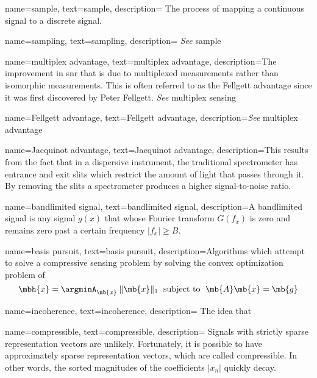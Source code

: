 {
name={sample},
text={sample},
description={ The process of mapping a continuous signal to a discrete signal.  }
}

{
name={sampling},
text={sampling},
description={ \emph{See} \gls{sample}  }
}



{
name={multiplex advantage},
text={multiplex advantage},
description={The improvement in \gls{snr} that is due to multiplexed measurements rather than isomorphic measurements. This is often referred to as the Fellgett advantage since it was first discovered by Peter Fellgett. \emph{See} \gls{multiplex sensing}} 
}

{
name={Fellgett advantage},
text={Fellgett advantage},
description={\emph{See} \gls{multiplex advantage}} 
}

{
name={Jacquinot advantage},
text={Jacquinot advantage},
description={This results from the fact that in a dispersive instrument, the traditional spectrometer has entrance and exit slits which restrict the amount of light that passes through it. By removing the slits a spectrometer produces a higher signal-to-noise ratio.} 
}

{
name={bandlimited signal},
text={bandlimited signal},
description={A bandlimited signal is any signal $ g(x) $ that whose Fourier transform $ G(f_x) $ is zero and remains zero past a certain frequency $ \lvert f_x \rvert \geq B$.} 
}

{
name={basis pursuit},
text={basis pursuit},
description={Algorithms which attempt to solve a compressive sensing problem by solving the convex optimization problem of 
\begin{equation}
	\mbh{x} = \argminA_{\mb{x}} \: \| \mb{x} \|_{1} \text{\; subject to \;} \mb{A}\mb{x} = \mb{g}
\end{equation} 
}
}

{
name={incoherence},
text={incoherence},
description={ The idea that }
}

{
name={compressible},
text={compressible},
description={ Signals with strictly sparse representation vectors are unlikely. Fortunately, it is possible to have approximately sparse representation vectors, which are called compressible. In other words, the sorted magnitudes of the coefficients $|x_n|$ quickly decay.}
}


